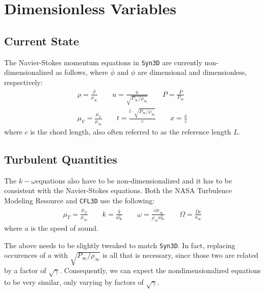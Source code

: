 \documentclass{SelimArticle}
\begin{document}
\maketitle
\newcommand{\kw}{$k-\omega$}
\section{Dimensionless Variables}
\newcommand{\pinf}{\ensuremath{P_\infty}}
\newcommand{\rinf}{\ensuremath{\rho_\infty}}
\newcommand{\minf}{\ensuremath{\mu_\infty}}
\newcommand{\pri}{\ensuremath{\pinf/\rinf}}
\subsection{Current State}
The Navier-Stokes momentum equations in \texttt{Syn3D} are currently non-dimensionalized
as follows, where $\overline{\phi}$ and $\phi$ are dimensional and dimensionless, respectively:
\begin{gather*}
    \rho = \frac{\overline{\rho}}{\rinf}
    \qquad u = \frac{\overline{u}}{\sqrt{\pri}}
    \qquad P = \frac{\overline{P}}{\pinf}
    \\
    \mu_V = \frac{\overline{\mu_V}}{\minf}
    \qquad t = \frac{\overline{t}\cdot\sqrt{\pri}}{c}
    \qquad x = \frac{\overline{x}}{c}
\end{gather*}
where $c$ is the chord length, also often referred to as the reference length $L$.

\subsection{Turbulent Quantities}
The \kw equations also have to be non-dimensionalized and it has to be consistent with the
Navier-Stokes equations. Both the NASA Turbulence Modeling Resource and \texttt{CFL3D}
use the following:
\begin{gather*}
    \mu_T = \frac{\overline{\mu}_T}{\minf}
    \qquad k = \frac{\overline{k}}{a_\infty^2}
    \qquad \omega = \frac{\overline{\omega}\minf}{\rinf a_\infty^2}
    \qquad \Omega = \frac{\overline{\Omega}c}{a_\infty}
\end{gather*}
where $a$ is the speed of sound.

The above needs to be slightly tweaked to match \texttt{Syn3D}. In fact, replacing
occurences of $a$ with $\sqrt{\pri}$ is all that is necessary, since those two are related
by a factor of $\sqrt{\gamma}$. Consequently, we can expect the nondimensionalized equations
to be very similar, only varying by factors of $\sqrt{\gamma}$.
\end{document}
